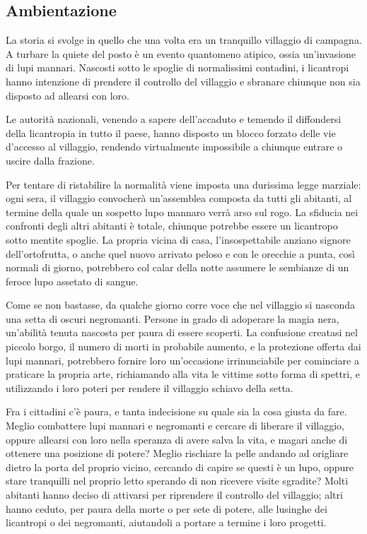 \documentclass[a4paper,10pt]{article}
\begin{document}
\subsection{Ambientazione}

La storia si svolge in quello che una volta era un tranquillo villaggio di campagna. A turbare la quiete del posto è un evento quantomeno atipico, ossia un'invasione di lupi mannari. Nascosti sotto le spoglie di normalissimi contadini, i licantropi hanno intenzione di prendere il controllo del villaggio e sbranare chiunque non sia disposto ad allearsi con loro.

Le autorità nazionali, venendo a sapere dell'accaduto e temendo il diffondersi della licantropia in tutto il paese, hanno disposto un blocco forzato delle vie d'accesso al villaggio, rendendo virtualmente impossibile a chiunque entrare o uscire dalla frazione.

Per tentare di ristabilire la normalità viene imposta una durissima legge marziale: ogni sera, il villaggio convocherà un'assemblea composta da tutti gli abitanti, al termine della quale un sospetto lupo mannaro verrà arso sul rogo. La sfiducia nei confronti degli altri abitanti è totale, chiunque potrebbe essere un licantropo sotto mentite spoglie. La propria vicina di casa, l'insospettabile anziano signore dell'ortofrutta, o anche quel nuovo arrivato peloso e con le orecchie a punta, così normali di giorno, potrebbero col calar della notte assumere le sembianze di un feroce lupo assetato di sangue.

Come se non bastasse, da qualche giorno corre voce che nel villaggio si nasconda una setta di oscuri negromanti. Persone in grado di adoperare la magia nera, un'abilità tenuta nascosta per paura di essere scoperti. La confusione creatasi nel piccolo borgo, il numero di morti in probabile aumento, e la protezione offerta dai lupi mannari, potrebbero fornire loro un'occasione irrinunciabile per cominciare a praticare la propria arte, richiamando alla vita le vittime sotto forma di spettri, e utilizzando i loro poteri per rendere il villaggio schiavo della setta.

Fra i cittadini c'è paura, e tanta indecisione su quale sia la cosa giusta da fare. Meglio combattere lupi mannari e negromanti e cercare di liberare il villaggio, oppure allearsi con loro nella speranza di avere salva la vita, e magari anche di ottenere una posizione di potere? Meglio rischiare la pelle andando ad origliare dietro la porta del proprio vicino, cercando di capire se questi è un lupo, oppure stare tranquilli nel proprio letto sperando di non ricevere visite sgradite? Molti abitanti hanno deciso di attivarsi per riprendere il controllo del villaggio; altri hanno ceduto, per paura della morte o per sete di potere, alle lusinghe dei licantropi o dei negromanti, aiutandoli a portare a termine i loro progetti.
\end{document}

